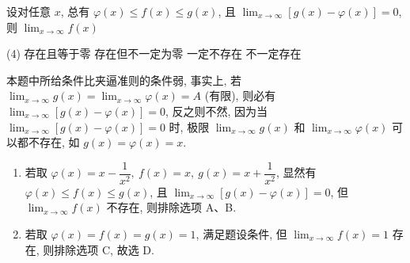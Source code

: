 \begin{example}[2000 数三]
    设对任意 $x$, 总有 $\varphi(x)\leqslant f(x)\leqslant g(x)$, 且 $\displaystyle\lim_{x\to\infty}[g(x)-\varphi(x)]=0$, 则 $\displaystyle\lim_{x\to\infty}f(x)$
    \begin{tasks}(4)
        \task 存在且等于零
        \task 存在但不一定为零
        \task 一定不存在
        \task 不一定存在
    \end{tasks}
\end{example}
\begin{solution}
    本题中所给条件比夹逼准则的条件弱, 事实上, 若 $\displaystyle\lim_{x\to\infty}g(x)=\lim_{x\to\infty}\varphi(x)=A$ (有限), 则必有 $\displaystyle\lim_{x\to\infty}[g(x)-\varphi(x)]=0$, 反之则不然, 因为当 $\displaystyle\lim_{x\to\infty}[g(x)-\varphi(x)]=0$ 时, 
    极限 $\displaystyle\lim_{x\to\infty}g(x)$ 和 $\displaystyle\lim_{x\to\infty}\varphi(x)$ 可以都不存在, 如 $g(x)=\varphi(x)=x$.
    \begin{enumerate}[label=(\arabic{*})]
        \item 若取 $\varphi(x)=x-\dfrac{1}{x^2},~f(x)=x,~g(x)=x+\dfrac{1}{x^2}$, 显然有 $\varphi(x)\leqslant f(x)\leqslant g(x)$, 且 $\displaystyle\lim_{x\to\infty}[g(x)-\varphi(x)]=0$, 但 $\displaystyle\lim_{x\to\infty}f(x)$ 不存在, 则排除选项 A、B.
        \item 若取 $\varphi(x)=f(x)=g(x)=1$, 满足题设条件, 但 $\displaystyle\lim_{x\to\infty}f(x)=1$ 存在, 则排除选项 C, 故选 D.
    \end{enumerate}
\end{solution}